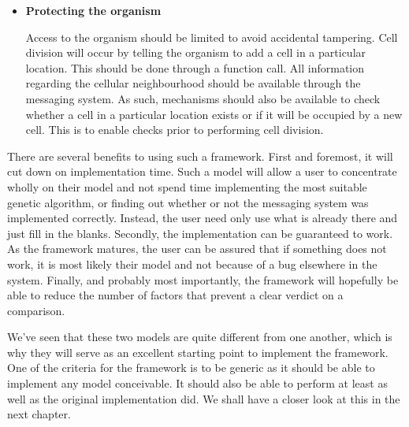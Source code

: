 \begin{itemize}
	\item\textbf{Protecting the organism}

	Access to the organism should be limited to avoid accidental tampering. Cell division will occur by telling the organism to add a cell in a particular location. This should be done through a function call. All information regarding the cellular neighbourhood should be available through the messaging system. As such, mechanisms should also be available to check whether a cell in a particular location exists or if it will be occupied by a new cell. This is to enable checks prior to performing cell division.
\end{itemize}

There are several benefits to using such a framework. First and foremost, it will cut down on implementation time. Such a model will allow a user to concentrate wholly on their model and not spend time implementing the most suitable genetic algorithm, or finding out whether or not the messaging system was implemented correctly. Instead, the user need only use what is already there and just fill in the blanks. Secondly, the implementation can be guaranteed to work. As the framework matures, the user can be assured that if something does not work, it is most likely their model and not because of a bug elsewhere in the system. Finally, and probably most importantly, the framework will hopefully be able to reduce the number of factors that prevent a clear verdict on a comparison.

We've seen that these two models are quite different from one another, which is why they will serve as an excellent starting point to implement the framework. One of the criteria for the framework is to be generic as it should be able to implement any model conceivable. It should also be able to perform at least as well as the original implementation did. We shall have a closer look at this in the next chapter.
